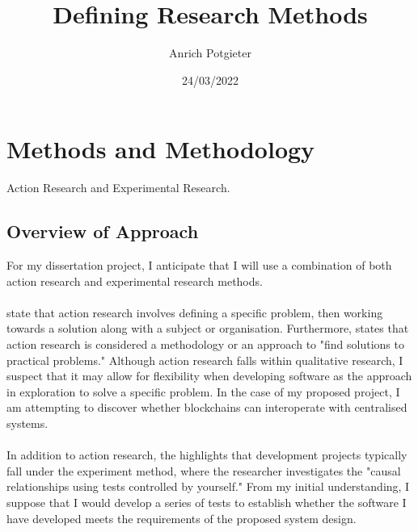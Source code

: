 \documentclass[12pt]{article}
\title{Defining Research Methods}
\author{Anrich Potgieter}
\date{24/03/2022}
\begin{document}
\maketitle
\tableofcontents

\section{Methods and Methodology}

Action Research and Experimental Research.

\subsection{Overview of Approach}

For my dissertation project, I anticipate that I will use a combination of both action research and experimental research methods.
\\\\
\autocite{dawsonChapterResearchMethods2015} state that action research involves defining a specific problem, then working towards a solution along with a subject or organisation.
Furthermore, \autocite{blairChapterChoosingMethodology2016} states that action research is considered a methodology or an approach to "find solutions to practical problems." 
Although action research falls within qualitative research, I suspect that it may allow for flexibility when developing software as the approach in exploration to solve a specific problem. In the case of my proposed project, I am attempting to discover whether blockchains can interoperate with centralised systems.
\\\\
In addition to action research, the \autocite{dawsonChapterResearchMethods2015} highlights that development projects typically fall under the experiment method, where the researcher investigates the "causal relationships using tests controlled by yourself."
From my initial understanding, I suppose that I would develop a series of tests to establish whether the software I have developed meets the requirements of the proposed system design.

\printbibliography
\end{document}
